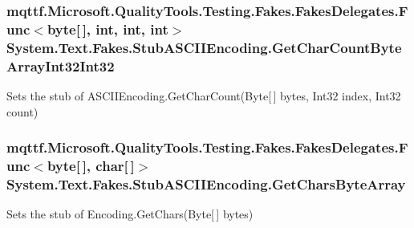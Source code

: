 \hypertarget{class_system_1_1_text_1_1_fakes_1_1_stub_a_s_c_i_i_encoding_a5ab4c2eb27806f71a43f5c1f71556835}{
\subsubsection[{Get\-Char\-Count\-Byte\-Array\-Int32\-Int32}]{\setlength{\rightskip}{0pt plus 5cm}mqttf.\-Microsoft.\-Quality\-Tools.\-Testing.\-Fakes.\-Fakes\-Delegates.\-Func$<$byte\mbox{[}$\,$\mbox{]}, int, int, int$>$ System.\-Text.\-Fakes.\-Stub\-A\-S\-C\-I\-I\-Encoding.\-Get\-Char\-Count\-Byte\-Array\-Int32\-Int32}}\label{class_system_1_1_text_1_1_fakes_1_1_stub_a_s_c_i_i_encoding_a5ab4c2eb27806f71a43f5c1f71556835}


Sets the stub of A\-S\-C\-I\-I\-Encoding.\-Get\-Char\-Count(\-Byte\mbox{[}$\,$\mbox{]} bytes, Int32 index, Int32 count)

\hypertarget{class_system_1_1_text_1_1_fakes_1_1_stub_a_s_c_i_i_encoding_ac64c05b29926c1d5bad0355b1eb2b35b}{
\subsubsection[{Get\-Chars\-Byte\-Array}]{\setlength{\rightskip}{0pt plus 5cm}mqttf.\-Microsoft.\-Quality\-Tools.\-Testing.\-Fakes.\-Fakes\-Delegates.\-Func$<$byte\mbox{[}$\,$\mbox{]}, char\mbox{[}$\,$\mbox{]}$>$ System.\-Text.\-Fakes.\-Stub\-A\-S\-C\-I\-I\-Encoding.\-Get\-Chars\-Byte\-Array}}\label{class_system_1_1_text_1_1_fakes_1_1_stub_a_s_c_i_i_encoding_ac64c05b29926c1d5bad0355b1eb2b35b}


Sets the stub of Encoding.\-Get\-Chars(\-Byte\mbox{[}$\,$\mbox{]} bytes)


